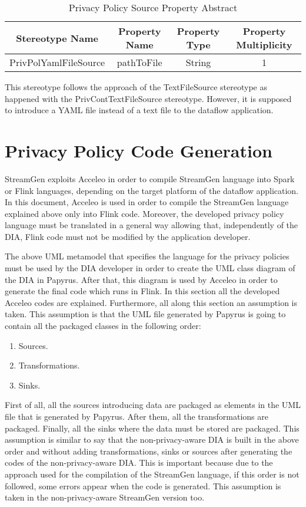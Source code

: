 \begin{table}[h!]
\centering
	\begin{tabular}{||c|c|c|c||} 
	\hline\hline
	Stereotype Name & Property Name & Property Type & Property Multiplicity \\ [1ex] 
	\hline\hline
	PrivPolYamlFileSource & pathToFile & String & 1 \\
	\hline\hline
	\end{tabular}
\caption{Privacy Policy Source Property Abstract}
\label{Privacy Policy Source Property Abstract}
\end{table}

This stereotype follows the approach of the TextFileSource stereotype as happened with the PrivContTextFileSource stereotype. However, it is supposed to introduce a YAML file instead of a text file to the dataflow application.

\section{Privacy Policy Code Generation}
\label{Privacy Policy Code Generation}


StreamGen exploits Acceleo in order to compile StreamGen language into Spark or Flink languages, depending on the target platform of the dataflow application. In this document, Acceleo is used in order to compile the StreamGen language explained above only into Flink code. Moreover, the developed privacy policy language must be translated in a general way allowing that, independently of the DIA, Flink code must not be modified by the application developer.

The above UML metamodel that specifies the language for the privacy policies must be used by the DIA developer in order to create the UML class diagram of the DIA in Papyrus. After that, this diagram is used by Acceleo in order to generate the final code which runs in Flink. In this section all the developed Acceleo codes are explained. Furthermore, all along this section an assumption is taken. This assumption is that the UML file generated by Papyrus is going to contain all the packaged classes in the following order:

\begin{enumerate}
\item Sources.
\item Transformations.
\item Sinks.
\end{enumerate}

First of all, all the sources introducing data are packaged as elements in the UML file that is generated by Papyrus. After them, all the transformations are packaged. Finally, all the sinks where the data must be stored are packaged. This assumption is similar to say that the non-privacy-aware DIA is built in the above order and without adding transformations, sinks or sources after generating the codes of the non-privacy-aware DIA. This is important because due to the approach used for the compilation of the StreamGen language, if this order is not followed, some errors appear when the code is generated. This assumption is taken in the non-privacy-aware StreamGen version too.

